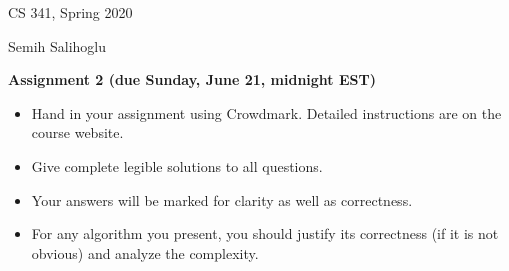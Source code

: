 \documentclass[11pt]{article}
\begin{document}

\hfill CS 341, Spring 2020\par
\hfill Semih Salihoglu

\bigskip
\begin{center}\large\bf Assignment 2 (due Sunday, June 21, midnight EST)
\end{center}

\begin{itemize}
\item Hand in your assignment using Crowdmark. Detailed instructions are on the course website.
\item Give complete legible solutions to all questions.
\item Your answers will be marked for clarity as well as correctness.
\item For any algorithm you present, you should justify its correctness
(if it is not obvious) and analyze the complexity.
\end{itemize}
\end{document}

